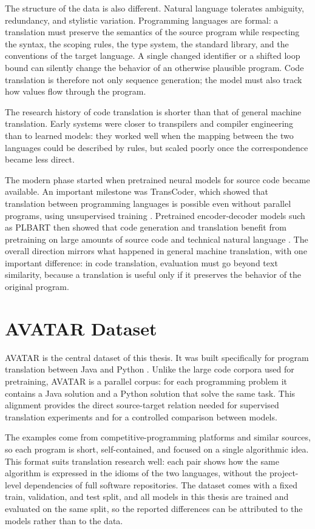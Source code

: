 The structure of the data is also different. Natural language tolerates
ambiguity, redundancy, and stylistic variation. Programming languages are
formal: a translation must preserve the semantics of the source program while
respecting the syntax, the scoping rules, the type system, the standard
library, and the conventions of the target language. A single changed
identifier or a shifted loop bound can silently change the behavior of an
otherwise plausible program. Code translation is therefore not only sequence
generation; the model must also track how values flow through the program.

The research history of code translation is shorter than that of general
machine translation. Early systems were closer to transpilers and compiler
engineering than to learned models: they worked well when the mapping between
the two languages could be described by rules, but scaled poorly once the
correspondence became less direct.

The modern phase started when pretrained neural models for source code became
available. An important milestone was TransCoder, which showed that
translation between programming languages is possible even without parallel
programs, using unsupervised training \cite{roziere2020transcoder}. Pretrained
encoder-decoder models such as PLBART then showed that code generation and
translation benefit from pretraining on large amounts of source code and
technical natural language \cite{ahmad2021plbart}. The overall direction
mirrors what happened in general machine translation, with one important
difference: in code translation, evaluation must go beyond text similarity,
because a translation is useful only if it preserves the behavior of the
original program.

\section{AVATAR Dataset}

\quad AVATAR is the central dataset of this thesis. It was built specifically
for program translation between Java and Python \cite{ahmad2023avatar}. Unlike
the large code corpora used for pretraining, AVATAR is a parallel corpus: for
each programming problem it contains a Java solution and a Python solution
that solve the same task. This alignment provides the direct source-target
relation needed for supervised translation experiments and for a controlled
comparison between models.

The examples come from competitive-programming platforms and similar sources,
so each program is short, self-contained, and focused on a single algorithmic
idea. This format suits translation research well: each pair shows how the
same algorithm is expressed in the idioms of the two languages, without the
project-level dependencies of full software repositories. The dataset comes
with a fixed train, validation, and test split, and all models in this thesis
are trained and evaluated on the same split, so the reported differences can
be attributed to the models rather than to the data.

